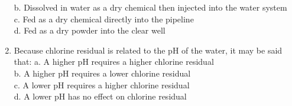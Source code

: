 \begin{enumerate}[1.]
b. Dissolved in water as a dry chemical then injected into the water system\\
c. Fed as a dry chemical directly into the pipeline\\
d. Fed as a dry powder into the clear well\\
\item Because chlorine residual is related to the $\mathrm{pH}$ of the water, it may be said that: a. A higher $\mathrm{pH}$ requires a higher chlorine residual\\
b. A higher $\mathrm{pH}$ requires a lower chlorine residual\\
c. A lower $\mathrm{pH}$ requires a higher chlorine residual\\
d. A lower $\mathrm{pH}$ has no effect on chlorine residual\\


\end{enumerate}
